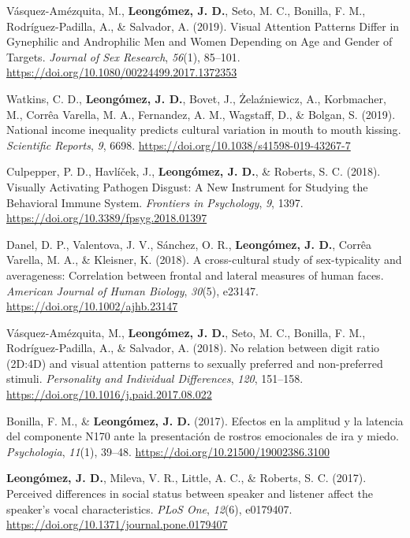 \documentclass[11pt, a4paper]{awesome-cv}
\begin{document}
\leavevmode{}%
Vásquez-Amézquita, M., \textbf{Leongómez, J. D.}, Seto, M. C., Bonilla,
F. M., Rodríguez-Padilla, A., \& Salvador, A. (2019). {Visual Attention
Patterns Differ in Gynephilic and Androphilic Men and Women Depending on
Age and Gender of Targets}. \emph{Journal of Sex Research},
\emph{56}(1), 85--101.
\url{https://doi.org/10.1080/00224499.2017.1372353}

\leavevmode{}%
Watkins, C. D., \textbf{Leongómez, J. D.}, Bovet, J., Żelaźniewicz, A.,
Korbmacher, M., Corrêa Varella, M. A., Fernandez, A. M., Wagstaff, D.,
\& Bolgan, S. (2019). {National income inequality predicts cultural
variation in mouth to mouth kissing}. \emph{Scientific Reports},
\emph{9}, 6698. \url{https://doi.org/10.1038/s41598-019-43267-7}

\leavevmode{}%
Culpepper, P. D., Havlíček, J., \textbf{Leongómez, J. D.}, \& Roberts,
S. C. (2018). {Visually Activating Pathogen Disgust: A New Instrument
for Studying the Behavioral Immune System}. \emph{Frontiers in
Psychology}, \emph{9}, 1397.
\url{https://doi.org/10.3389/fpsyg.2018.01397}

\leavevmode{}%
Danel, D. P., Valentova, J. V., Sánchez, O. R.,
\textbf{Leongómez, J. D.}, Corrêa Varella, M. A., \& Kleisner, K.
(2018). {A cross-cultural study of sex-typicality and averageness:
Correlation between frontal and lateral measures of human faces}.
\emph{American Journal of Human Biology}, \emph{30}(5), e23147.
\url{https://doi.org/10.1002/ajhb.23147}

\leavevmode{}%
Vásquez-Amézquita, M., \textbf{Leongómez, J. D.}, Seto, M. C., Bonilla,
F. M., Rodríguez-Padilla, A., \& Salvador, A. (2018). {No relation
between digit ratio (2D:4D) and visual attention patterns to sexually
preferred and non-preferred stimuli}. \emph{Personality and Individual
Differences}, \emph{120}, 151--158.
\url{https://doi.org/10.1016/j.paid.2017.08.022}

\leavevmode{}%
Bonilla, F. M., \& \textbf{Leongómez, J. D.} (2017). {Efectos en la
amplitud y la latencia del componente N170 ante la presentaci{ó}n de
rostros emocionales de ira y miedo}. \emph{Psychologia}, \emph{11}(1),
39--48. \url{https://doi.org/10.21500/19002386.3100}

\leavevmode{}%
\textbf{Leongómez, J. D.}, Mileva, V. R., Little, A. C., \& Roberts, S.
C. (2017). {Perceived differences in social status between speaker and
listener affect the speaker's vocal characteristics}. \emph{PLoS One},
\emph{12}(6), e0179407.
\url{https://doi.org/10.1371/journal.pone.0179407}
\end{document}
